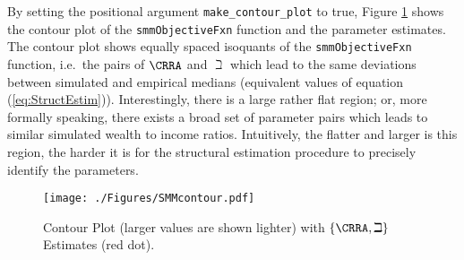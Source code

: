 \documentclass[\econtexRoot/SolvingMicroDSOPs]{subfiles}
\begin{document}
By setting the positional argument \texttt{make\_contour\_plot} to true, Figure \ref{fig:PlotContourMedianStrEst} shows the contour plot of the \texttt{smmObjectiveFxn} function and the parameter estimates. The contour plot shows equally spaced isoquants of the \texttt{smmObjectiveFxn} function, i.e.\ the pairs of $\CRRA$ and $\beth$ which lead to the same deviations between simulated and empirical medians (equivalent values of equation (\ref{eq:StructEstim})). Interestingly, there is a large rather flat region; or, more formally speaking, there exists a broad set of parameter pairs which leads to similar simulated wealth to income ratios. Intuitively, the flatter and larger is this region, the harder it is for the structural estimation procedure to precisely identify the parameters.


\hypertarget{PlotContourMedianStrEst}{}
\begin{figure}
  \texttt{[image: ./Figures/SMMcontour.pdf]}
  \caption{Contour Plot (larger values are shown lighter) with $\{\CRRA,\beth\}$ Estimates (red dot).}
  \label{fig:PlotContourMedianStrEst}
\end{figure}
\end{document}
